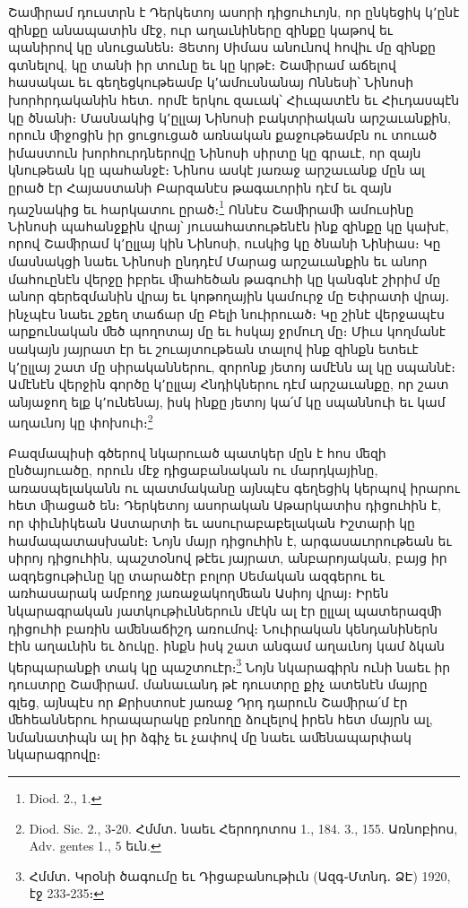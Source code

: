 \documentclass{article}
\begin{document}
{Շաﬕրամ դուստրն է Դերկետոյ ասորի դիցուհւոյն, որ ընկեցիկ կ՚ընէ զինքը անապատին մէջ, ուր աղաւնիները զինքը կաթով եւ պանիրով կը սնուցանեն։ Յետոյ Սիմաս անունով հովիւ մը զինքը գտնելով, կը տանի իր տունը եւ կը կրթէ։ Շաﬕրամ աճելով հասակաւ եւ գեղեցկութեամբ կ՚ամուսնանայ Ոննեսի՝ Նինոսի խորհրդականին հետ․ որմէ երկու զաւակ՝ Հիւպատէն եւ Հիւդասպէն կը ծնանի։ Մասնակից կ՚ըլլայ Նինոսի բակտրիական արշաւանքին, որուն ﬕջոցին իր ցուցուցած առնական քաջութեամբն ու տուած իմաստուն խորհուրդներովը Նինոսի սիրտը կը գրաւէ, որ զայն կնութեան կը պահանջէ։ Նինոս ասկէ յառաջ արշաւանք մըն ալ ըրած էր Հայաստանի Բարզանէս թագաւորին դէմ եւ զայն դաշնակից եւ հարկատու ըրած։\footnote{Diod. 2., 1.} Ոննէս Շաﬕրաﬕ ամուսինը Նինոսի պահանջքին վրայ՝ յուսահատութենէն ինք զինքը կը կախէ, որով Շաﬕրամ կ՚ըլլայ կին Նինոսի, ուսկից կը ծնանի Նինիաս։ Կը մասնակցի նաեւ Նինոսի ընդդէմ Մարաց արշաւանքին եւ անոր մահուընէն վերջը իբրեւ ﬕահեծան թագուհի կը կանգնէ շիրիմ մը անոր գերեզմանին վրայ եւ կոթողային կամուրջ մը Եփրատի վրայ․ ինչպէս նաեւ շքեղ տաճար մը Բելի նուիրուած։ Կը շինէ վերջապէս արքունական ﬔծ պողոտայ մը եւ հսկայ ջրմուղ մը։ Միւս կողմանէ սակայն յայրատ էր եւ շուայտութեան տալով ինք զինքն ետեւէ կ՚ըլլայ շատ մը սիրականներու, զորոնք յետոյ ամէնն ալ կը սպաննէ։ Ամէնէն վերջին գործը կ՚ըլլայ Հնդիկներու դէմ արշաւանքը, որ շատ անյաջող ելք կ՚ունենայ, իսկ ինքը յետոյ կա՛մ կը սպաննուի եւ կամ աղաւնոյ կը փոխուի։\footnote{Diod. Sic. 2., 3֊20. Հմմտ․ նաեւ Հերոդոտոս 1., 184. 3., 155. Առնոբիոս, Adv. gentes 1., 5 եւն.}

Բազմապիսի գծերով նկարուած պատկեր մըն է հոս ﬔզի ընծայուածը, որուն մէջ դիցաբանական ու մարդկայինը, առասպելականն ու պատմականը այնպէս գեղեցիկ կերպով իրարու հետ ﬕացած են։ Դերկետոյ ասորական Աթարկատիս դիցուհին է, որ փիւնիկեան Աստարտի եւ ասուրաբաբելական Իշտարի կը համապատասխանէ։ Նոյն մայր դիցուհին է, արգասաւորութեան եւ սիրոյ դիցուհին, պաշտօնով թէեւ յայրատ, անբարոյական, բայց իր ազդեցութիւնը կը տարածէր բոլոր Սեմական ազգերու եւ առհասարակ ամբողջ յառաջակողﬔան Ասիոյ վրայ։ Իրեն նկարագրական յատկութիւններուն մէկն ալ էր ըլլալ պատերազﬕ դիցուհի բառին աﬔնաճիշդ առումով։ Նուիրական կենդանիներն էին աղաւնին եւ ձուկը․ ինքն իսկ շատ անգամ աղաւնոյ կամ ձկան կերպարանքի տակ կը պաշտուէր։\footnote{Հմմտ․ Կրօնի ծագումը եւ Դիցաբանութիւն (Ազգ֊Մտնդ․ ՁԷ) 1920, էջ 233֊235։} Նոյն նկարագիրն ունի նաեւ իր դուստրը Շաﬕրամ․ մանաւանդ թէ դուստրը քիչ ատենէն մայրը գլեց, այնպէս որ Քրիստոսէ յառաջ Դրդ դարուն Շաﬕրա՛մ էր ﬔհեաններու հրապարակը բռնողը ձուլելով իրեն հետ մայրն ալ, նմանատիպն ալ իր ձգիչ եւ չափով մը նաեւ աﬔնապարփակ նկարագրովը։

}
\end{document}
